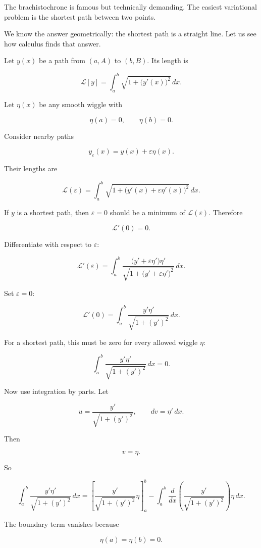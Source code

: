 The brachistochrone is famous but technically demanding.  The easiest variational
problem is the shortest path between two points.

We know the answer geometrically: the shortest path is a straight line.  Let us see how
calculus finds that answer.

Let \(y(x)\) be a path from \((a,A)\) to \((b,B)\).  Its length is

\[
\mathcal{L}[y]
=
\int_a^b \sqrt{1+\bigl(y'(x)\bigr)^2}\,dx.
\]

Let \(\eta(x)\) be any smooth wiggle with

\[
\eta(a)=0,
\qquad
\eta(b)=0.
\]

Consider nearby paths

\[
y_\varepsilon(x)=y(x)+\varepsilon\eta(x).
\]

Their lengths are

\[
\mathcal{L}(\varepsilon)
=
\int_a^b
\sqrt{1+\bigl(y'(x)+\varepsilon\eta'(x)\bigr)^2}
\,dx.
\]

If \(y\) is a shortest path, then \(\varepsilon=0\) should be a minimum of
\(\mathcal{L}(\varepsilon)\).  Therefore

\[
\mathcal{L}'(0)=0.
\]

Differentiate with respect to \(\varepsilon\):

\[
\mathcal{L}'(\varepsilon)
=
\int_a^b
\frac{\bigl(y'+\varepsilon\eta'\bigr)\eta'}
{\sqrt{1+\bigl(y'+\varepsilon\eta'\bigr)^2}}
\,dx.
\]

Set \(\varepsilon=0\):

\[
\mathcal{L}'(0)
=
\int_a^b
\frac{y'\eta'}{\sqrt{1+(y')^2}}
\,dx.
\]

For a shortest path, this must be zero for every allowed wiggle \(\eta\):

\[
\int_a^b
\frac{y'\eta'}{\sqrt{1+(y')^2}}
\,dx=0.
\]

Now use integration by parts.  Let

\[
u=\frac{y'}{\sqrt{1+(y')^2}},
\qquad
dv=\eta'\,dx.
\]

Then

\[
v=\eta.
\]

So

\[
\int_a^b
\frac{y'\eta'}{\sqrt{1+(y')^2}}
\,dx
=
\left[
\frac{y'}{\sqrt{1+(y')^2}}\eta
\right]_a^b
-
\int_a^b
\frac{d}{dx}
\left(
\frac{y'}{\sqrt{1+(y')^2}}
\right)
\eta\,dx.
\]

The boundary term vanishes because

\[
\eta(a)=\eta(b)=0.
\]


